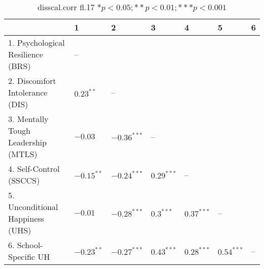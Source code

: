 \begin{table}[ht]
\centering
\begin{tabular}{lllllll}
  \hline
 & 1 & 2 & 3 & 4 & 5 & 6 \\ 
  \hline
1. Psychological Resilience (BRS) & -- &  &  &  &  &  \\ 
  2. Discomfort Intolerance (DIS) & $0.23^{**}$ & -- &  &  &  &  \\ 
  3. Mentally Tough Leadership (MTLS) & $-0.03$ & $-0.36^{***}$ & -- &  &  &  \\ 
  4. Self-Control (SSCCS) & $-0.15^{**}$ & $-0.24^{***}$ & $0.29^{***}$ & -- &  &  \\ 
  5. Unconditional Happiness (UHS) & $-0.01$ & $-0.28^{***}$ & $0.3^{***}$ & $0.37^{***}$ & -- &  \\ 
  6. School-Specific UH & $-0.23^{**}$ & $-0.27^{***}$ & $0.43^{***}$ & $0.28^{***}$ & $0.54^{***}$ & -- \\ 
   \hline
\end{tabular}
\caption{disscal.corr fl.17 $* p < 0.05; ** p < 0.01; *** p < 0.001$} 
\label{freq_corr.disscal.corr.fl.17}
\end{table}
